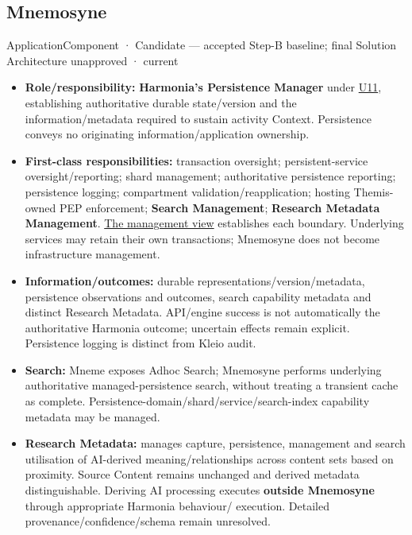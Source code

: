 \subsection{Mnemosyne}

\label{element:7985e647bf9e4ca3ba70faf9e3e4ae02}
{\small ApplicationComponent · Candidate — accepted Step-B baseline; final Solution Architecture unapproved · current}\par

\begin{itemize}


\item \textbf{Role/responsibility:} \textbf{Harmonia's Persistence Manager} under
  \href{\detokenize{../../../../../docs/markdown/05-information-systems-architecture/sources.md#u11}}{U11}, establishing authoritative durable state/version and the
  information/metadata required to sustain activity Context. Persistence conveys
  no originating information/application ownership.

\item \textbf{First-class responsibilities:} transaction oversight; persistent-service
  oversight/reporting; shard management; authoritative persistence reporting;
  persistence logging; compartment validation/reapplication; hosting Themis-owned
  PEP enforcement; \textbf{Search Management}; \textbf{Research Metadata Management}.
  \hyperref[element:7985e647bf9e4ca3ba70faf9e3e4ae02]{The management view}
  establishes each boundary. Underlying services may retain their own transactions;
  Mnemosyne does not become infrastructure management.

\item \textbf{Information/outcomes:} durable representations/version/metadata, persistence
  observations and outcomes, search capability metadata and distinct Research Metadata.
  API/engine success is not automatically the authoritative Harmonia outcome;
  uncertain effects remain explicit. Persistence logging is distinct from Kleio audit.

\item \textbf{Search:} Mneme exposes Adhoc Search; Mnemosyne performs underlying authoritative
  managed-persistence search, without treating a transient cache as complete.
  Persistence-domain/shard/service/search-index capability metadata may be managed.

\item \textbf{Research Metadata:} manages capture, persistence, management and search utilisation
  of AI-derived meaning/relationships across content sets based on proximity. Source
  Content remains unchanged and derived metadata distinguishable. Deriving AI
  processing executes \textbf{outside Mnemosyne} through appropriate Harmonia behaviour/
  execution. Detailed provenance/confidence/schema remain unresolved.


\end{itemize}
